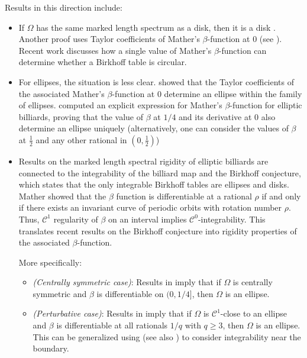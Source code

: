 \documentclass[12pt, openany]{amsart}
\theoremstyle{definition}
\theoremstyle{remark}
\theoremstyle{remark}
\theoremstyle{theorem}
\theoremstyle{theorem}
\theoremstyle{theorem}
\theoremstyle{theorem}
\begin{document}
Results in this direction include:
\begin{itemize}
    \item[{(i)}] If $\Omega$ has the same marked length spectrum as a disk, then it is a disk \cite{Siburg}. Another proof uses Taylor coefficients of Mather's $\beta$-function at $0$ (see \cite{MM, SorDCDS}). Recent work \cite{BBS} discusses how a single value of Mather’s $\beta$-function can determine whether a Birkhoff table is circular.
    
    \smallskip
    \item[(ii)] For ellipses, the situation is less clear. \cite{SorDCDS} showed that the Taylor coefficients of the associated Mather's $\beta$-function at $0$ determine an ellipse within the family of ellipses. \cite{Bialyellipses} computed an explicit expression for Mather's $\beta$-function for elliptic billiards, proving that the value of $\beta$ at $1/4$ and its derivative at $0$ also determine an ellipse uniquely (alternatively, one can consider the values of $\beta$ at $\frac 12$ and any other rational in $(0,\frac 12)$)
    
    \smallskip
    \item[{(iii)}] Results on the marked length spectral rigidity of elliptic billiards are connected to the integrability of the billiard map and the Birkhoff conjecture, which states that the only integrable Birkhoff tables are ellipses and disks. Mather \cite{Mather90} showed that the $\beta$ function is differentiable at a rational $\rho$ if and only if there exists an invariant curve of periodic orbits with rotation number $\rho$. Thus, $\mathscr{C}^1$ regularity of $\beta$ on an interval implies $\mathscr{C}^0$-integrability. This translates recent results on the Birkhoff conjecture into rigidity properties of the associated $\beta$-function.
    
\noindent     More specifically:
    \begin{itemize}
        \item[a)] \textit{(Centrally symmetric case)}: Results in \cite{BialyMironov} imply that if $\Omega$ is centrally symmetric and $\beta$ is differentiable on $(0,1/4]$, then $\Omega$ is an ellipse.
        \item[b)] \textit{(Perturbative case)}: Results in \cite{ADK, KS} imply that if $\Omega$ is $\mathscr{C}^1$-close to an ellipse and $\beta$ is differentiable at all rationals $1/q$ with $q \geq 3$, then $\Omega$ is an ellipse. This can be generalized using \cite{Koval} (see also \cite{HKS}) to consider integrability near the boundary.
    \end{itemize}
\end{itemize}
\end{document}
